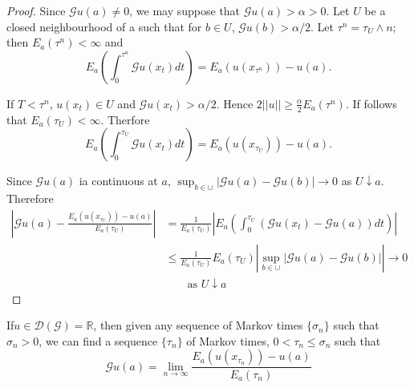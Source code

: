 \begin{proof}
Since $\mathscr{G} u (a) \neq 0$, we may suppose that $\mathscr{G} u
  (a) > \alpha > 0$. Let $U$ be a closed neighbourhood of a such that
  for $b \in U$, $\mathscr{G} u(b) >\alpha /2$. Let $\tau^n =
  \tau_U \wedge n$; then $E_a (\tau^n) < \infty$ and  
  $$
  E_a \left(\int^{\tau^n}_0 \mathscr{G} u (x_t) dt\right) = E_a (u
  (x_{\tau^n})) -u (a). 
  $$

If $T < \tau^n$, $u(x_t)\in U$ and $\mathscr{G} u (x_t) > \alpha/2$. Hence
$2 || u || \geq \frac{\alpha}{2} E_a (\tau^n)$. If follows that $E_a
(\tau_U) < \infty$. Therfore 
$$
E_a \left(\int^{\tau_U}_0 \mathscr{G} u (x_t) dt\right) = E_a (u
(x_{\tau_U})) - u (a). 
$$

Since $\mathscr{G} u (a)$ ia continuous at $a$, $\sup_{b \in
  \cup} |\mathscr{G} u (a) - \mathscr{G} u (b)|\to 0$ as $U \downarrow
a$. Therefore 
{\fontsize{10pt}{12pt}\selectfont
\begin{align*}
\left| \mathscr{G} u (a) - \frac{E_a (u (x_{\tau_U})) - u (a)}
      {E_a (\tau_U)} \right| &=\frac{1}{E_a (\tau_U)}\left|E_a
      \left(\int^{\tau_U}_0 (\mathscr{G} u (x_t) - \mathscr{G} u (a))
      dt\right)\right|\\ 
      &\leq \frac{1}{E_a (\tau_U)} E_a (\tau_U) \left|
      \sup_{b \in \cup} |\mathscr{G} u (a) - \mathscr{G} u
      (b)|\right| \to 0\\
&\qquad  \text{as \ } U \downarrow a 
\end{align*}}\relax
\end{proof}

\begin{thm}\label{chap2-sec9-thm11}%
  If\pageoriginale $u \in \mathscr{D} (\mathscr{G}) = \mathbb{R}$, then
  given any sequence of Markov times $\{\sigma_n\}$ such that
  $\sigma_n > 0$, we can find a sequence $\{\tau_n\}$ of Markov times,
  $0 < \tau_n \leq \sigma_n $ such that 
  $$
  \mathscr{G} u (a) = \lim_{n \to \infty} \frac{E_a (u(x_{\tau_n}))
    - u(a)}{E_a(\tau_n)} 
  $$
\end{thm}


